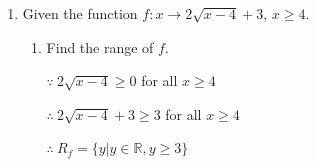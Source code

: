 \documentclass[12pt]{report}
\begin{document}
\begin{enumerate}
\begin{enumerate}
            \end{enumerate}

            \newpage
      \item Given the function $f:x \to 2\sqrt{x-4} + 3$, $x \geq 4$.
            \begin{enumerate}
                  \item Find the range of $f$. \sol{}

                        $\because\ 2\sqrt{x-4} \geq 0$ for all $x \geq 4$

                        $\therefore\ 2\sqrt{x-4} + 3 \geq 3$ for all $x \geq 4$

                        $\therefore\ R_f = \{y | y \in \mathbb{R}, y \geq 3\}$


\end{enumerate}
\end{enumerate}
\end{document}
